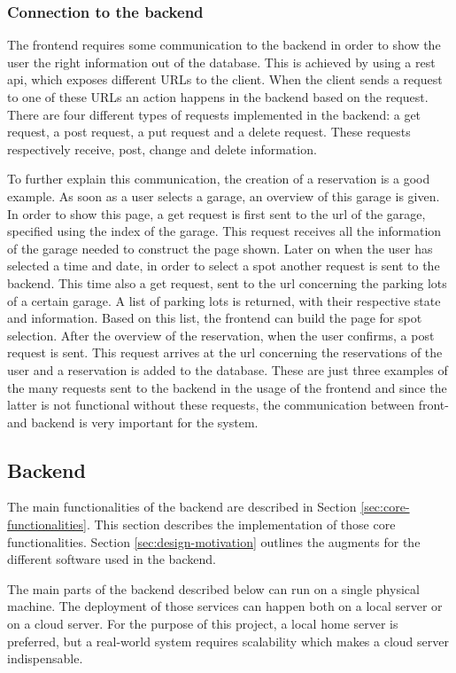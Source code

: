 \subsubsection{Connection to the backend}
The frontend requires some communication to the backend in order to show the user the right information out of the database. This is achieved by using a \ac{rest} \ac{api}, which exposes different URLs to the client. When the client sends a request to one of these URLs an action happens in the backend based on the request. There are four different types of requests implemented in the backend: a get request, a post request, a put request and a delete request. These requests respectively receive, post, change and delete information.

To further explain this communication, the creation of a reservation is a good example. As soon as a user selects a garage, an overview of this garage is given. In order to show this page, a get request is first sent to the \ac{url} of the garage, specified using the index of the garage. This request receives all the information of the garage needed to construct the page shown. Later on when the user has selected a time and date, in order to select a spot another request is sent to the backend. This time also a get request, sent to the \ac{url} concerning the parking lots of a certain garage. A list of parking lots is returned, with their respective state and information. Based on this list, the frontend can build the page for spot selection. After the overview of the reservation, when the user confirms, a post request is sent. This request arrives at the \ac{url} concerning the reservations of the user and a reservation is added to the database. These are just three examples of the many requests sent to the backend in the usage of the frontend and since the latter is not functional without these requests, the communication between front- and backend is very important for the system.


\subsection{Backend}\label{sec:implementation-backend}
The main functionalities of the backend are described in Section \ref{sec:core-functionalities}. This section describes the implementation of those core functionalities. Section \ref{sec:design-motivation} outlines the augments for the different software used in the backend.

\ind The main parts of the backend described below can run on a single physical machine. The deployment of those services can happen both on a local server or on a cloud server. For the purpose of this project, a local home server is preferred, but a real-world system requires scalability which makes a cloud server indispensable.

